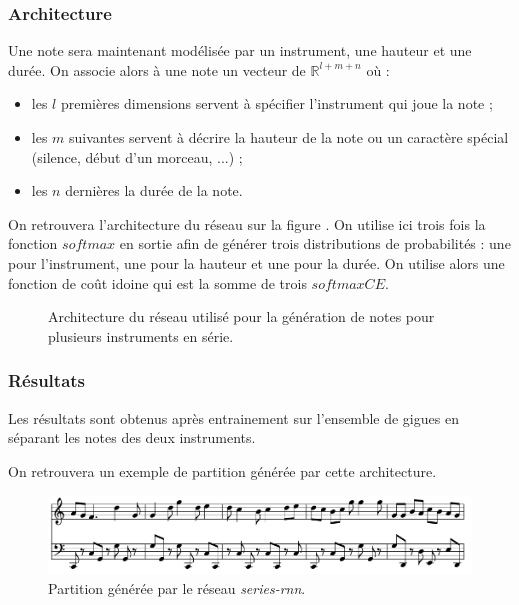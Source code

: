 \subsubsection{Architecture}

Une note sera maintenant modélisée par un instrument, une hauteur et une durée. On associe alors à une note un vecteur de $\mathbb{R}^{l+m+n}$ où :
\begin{itemize}
\item les $l$ premières dimensions servent à spécifier l'instrument qui joue la note ;
\item les $m$ suivantes servent à décrire la hauteur de la note ou un caractère spécial (silence, début d'un morceau, ...) ;
\item les $n$ dernières la durée de la note.
\end{itemize}

On retrouvera l'architecture du réseau sur la figure \label{series_rnn}. On utilise ici trois fois la fonction $softmax$ en sortie afin de générer trois distributions de probabilités : une pour l'instrument, une pour la hauteur et une pour la durée. On utilise alors une fonction de coût idoine qui est la somme de trois $softmaxCE$. 

\begin{figure}[h!]
\begin{center}

\caption{Architecture du réseau utilisé pour la génération de notes pour plusieurs instruments en série.}
\label{series_rnn}
\end{center}
\end{figure}

\subsubsection{Résultats}

Les résultats sont obtenus après entrainement sur l'ensemble de gigues en séparant les notes des deux instruments.

On retrouvera un exemple de partition générée par cette architecture.

\begin{figure}[h!]
\begin{center}
\includegraphics[scale=0.3]{images/chapter9/series_rnn_result.png}
\caption{Partition générée par le réseau \textit{series-rnn}.}
\end{center}
\end{figure}

